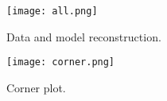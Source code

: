 \documentclass[12pt]{article}
\begin{document}


\begin{figure}[!htb]
	\centering
	\texttt{[image: all.png]}
	\caption{Data and model reconstruction. \label{fig:all}}
\end{figure}






\clearpage
\pagebreak

\begin{figure}[!htb]
	\centering
	\texttt{[image: corner.png]}
	\caption{Corner plot. \label{fig:corner}}
\end{figure}

\clearpage
\pagebreak
\end{document}
